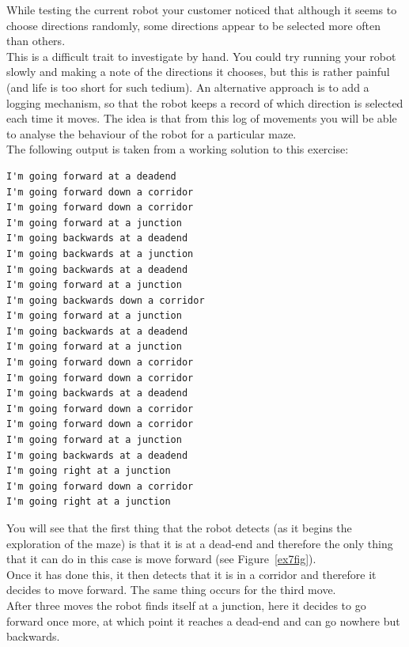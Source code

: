 \noindent
While testing the current robot your customer noticed that although
it seems to choose directions randomly, some directions appear to be selected 
more often than others. \\

\noindent
This is a difficult trait to investigate by hand. You could try running your robot 
slowly and making a note of the directions it chooses, but this is rather 
painful (and life is too short for such tedium). An alternative 
approach is to add a logging mechanism, so that the robot keeps a record of which
direction is selected each time it moves. The idea is that from this 
log of movements you will be able to analyse the behaviour of the
robot for a particular maze. \\

\noindent
The following output is taken from a working solution to this exercise:

\begin{verbatim}
I'm going forward at a deadend
I'm going forward down a corridor
I'm going forward down a corridor
I'm going forward at a junction
I'm going backwards at a deadend
I'm going backwards at a junction
I'm going backwards at a deadend
I'm going forward at a junction
I'm going backwards down a corridor
I'm going forward at a junction
I'm going backwards at a deadend
I'm going forward at a junction
I'm going forward down a corridor
I'm going forward down a corridor
I'm going backwards at a deadend
I'm going forward down a corridor
I'm going forward down a corridor
I'm going forward at a junction
I'm going backwards at a deadend
I'm going right at a junction
I'm going forward down a corridor
I'm going right at a junction                                                  
\end{verbatim}

\noindent
You will see that the first thing that the robot detects (as it begins the 
exploration of the maze) is that it is at a dead-end and therefore the only 
thing that it can do in this case is move forward (see Figure~\ref{ex7fig}).\\

\noindent
Once it has done this, it then detects that it is in a corridor and therefore
it decides to move forward. The same thing occurs for the third move.\\

\noindent
After three moves the robot finds itself at a junction, here it decides to go
forward once more, at which point it reaches a dead-end and can go nowhere but
backwards. \\


